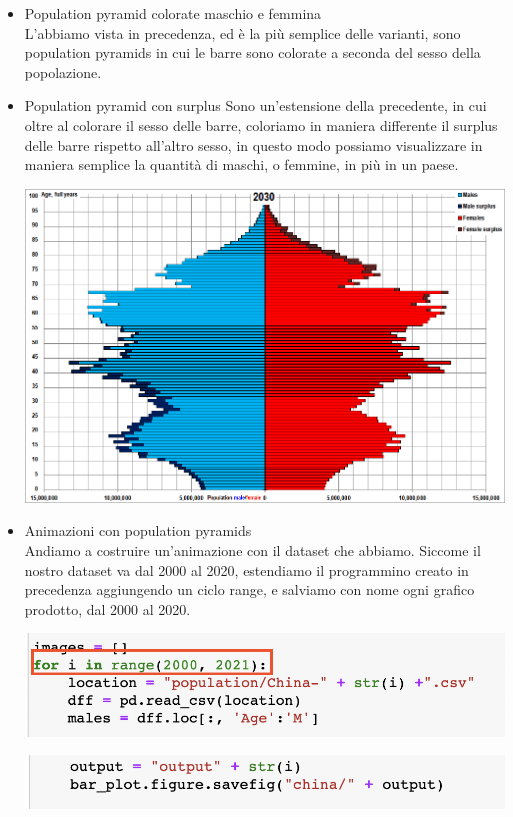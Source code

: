 \documentclass[11pt, oneside]{article}   	%
\begin{document}
\begin{itemize}
\item Population pyramid colorate maschio e femmina\\
L'abbiamo vista in precedenza, ed è la più semplice delle varianti, sono population pyramids in cui le barre sono colorate a seconda del sesso della popolazione.
\item Population pyramid con surplus
Sono un'estensione della precedente, in cui oltre al colorare il sesso delle barre, coloriamo in maniera differente il surplus delle barre rispetto all'altro sesso, in questo modo possiamo visualizzare in maniera semplice la quantità di maschi, o femmine, in più in un paese.
\begin{center}
\includegraphics[scale=0.3]{china}
\end{center}
\item Animazioni con population pyramids\\
Andiamo a costruire un'animazione con il dataset che abbiamo.
Siccome il nostro dataset va dal 2000 al 2020, estendiamo il programmino creato in precedenza aggiungendo un ciclo range, e salviamo con nome ogni grafico prodotto, dal 2000 al 2020.

\begin{center}
\includegraphics[scale=0.5]{china1}

\includegraphics[scale=0.55]{china2}


\end{center}
\end{itemize}
\end{document}
